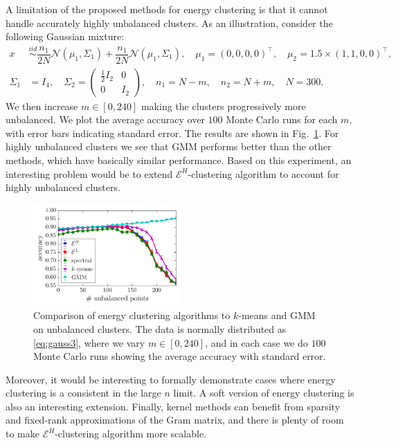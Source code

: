 \documentclass[aps,preprint,nofootinbib,floatfix]{revtex4-1}
\begin{document}
A limitation of the proposed methods for energy clustering is that it cannot
handle accurately highly unbalanced clusters. As an illustration,
consider the following Gaussian mixture:
\begin{equation}
\label{eq:gauss3}
\begin{split}
x &\stackrel{iid} \sim  
\dfrac{n_1}{2N} \mathcal{N}(\mu_1,\Sigma_1)+
\dfrac{n_1}{2N} \mathcal{N}(\mu_1,\Sigma_1), \quad 
\mu_1 = (0,0,0,0)^\top , \quad
\mu_2 = 1.5\times (1,1,0,0)^\top, \\
\Sigma_1 &= I_4, \quad
\Sigma_2 = \left( 
\begin{array}{c|c} 
\tfrac{1}{2} I_2 & 0  \\ \hline
0 & I_2 
\end{array}\right), \quad
n_1 = N - m, \quad  n_2 = N + m, \quad N=300.
\end{split}
\end{equation}
We then increase $m \in [0,240]$ making
the clusters progressively more unbalanced.
We plot the average accuracy over
$100$ Monte Carlo runs for each $m$, with error bars indicating 
standard error. 
The results are shown in Fig.~\ref{fig:unbalanced}.
For highly unbalanced clusters we see that GMM performs better than
the other methods, which have basically similar performance.
Based on this experiment, an interesting problem would be to
extend $\mathcal{E}^H$-clustering algorithm to account for 
highly unbalanced clusters.

\begin{figure}
\includegraphics[width=0.5\textwidth]{normal_unbalanced.pdf}\vspace{-1em}
\caption{
\label{fig:unbalanced}
Comparison of energy clustering algorithms to $k$-means and GMM on
unbalanced clusters. The data is normally 
distributed as \eqref{eq:gauss3}, where
we vary $m \in [0, 240]$, and in each case we do $100$ Monte Carlo runs
showing the average accuracy with standard error.
}
\end{figure}

Moreover, it would be interesting to formally 
demonstrate cases where energy clustering is a 
consistent in the large $n$ limit. 
A soft version of energy clustering is also an
interesting extension.
Finally, kernel methods can benefit from sparsity and
fixed-rank approximations of the Gram matrix, and there is plenty
of room to make $\mathcal{E}^H$-clustering algorithm more scalable.
\end{document}
